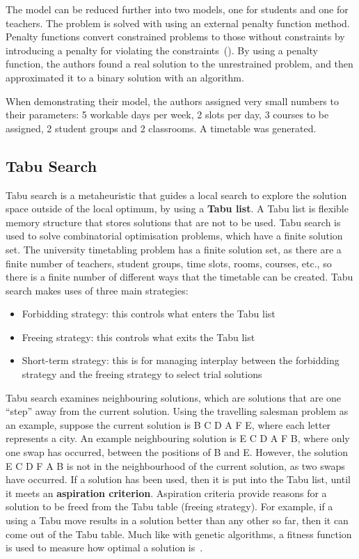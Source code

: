 \documentclass[a4paper, 12pt]{report}
\begin{document}
The model can be reduced further into two models, one for students and one for
teachers.
The problem is solved with using an external penalty function method. Penalty
functions convert constrained problems to those without constraints by
introducing a penalty for violating the constraints~(\cite{penalty_function}).
By using a penalty function, the authors found a real solution
to the unrestrained problem, and then approximated it to a binary solution with
an algorithm.

When demonstrating their model, the authors assigned very small numbers to their
parameters: 5 workable days per week, 2 slots per day, 3 courses to be assigned,
2 student groups and 2 classrooms. A timetable was generated.

\subsection{Tabu Search}

Tabu search is a metaheuristic that guides a local search to explore the
solution space outside of the local optimum, by using a \textbf{Tabu list}.
A Tabu list is flexible memory structure that stores solutions that are not to
be used.
Tabu search is used to solve combinatorial optimisation problems, which have a
finite solution set.
The university timetabling problem has a finite solution set, as there are a
finite number of teachers, student groups, time slots, rooms, courses, etc., so
there is a finite number of different ways that the timetable can be created.
Tabu search makes uses of three main strategies:
\begin{itemize}
	\item Forbidding strategy: this controls what enters the Tabu list
	\item Freeing strategy: this controls what exits the Tabu list
	\item Short-term strategy: this is for managing interplay between the
		forbidding strategy and the freeing strategy to select trial solutions
\end{itemize}
Tabu search examines neighbouring solutions, which are solutions that are one
“step” away from the current solution.
Using the travelling salesman problem as an example, suppose the current
solution is B C D A F E, where each letter represents a city.
An example neighbouring solution is E C D A F B, where only one swap has
occurred, between the positions of B and E.
However, the solution E C D F A B is not in the neighbourhood of the current
solution, as two swaps have occurred.
If a solution has been used, then it is put into the Tabu list, until it meets
an \textbf{aspiration criterion}.
Aspiration criteria provide reasons for a solution to be freed from the Tabu
table (freeing strategy).
For example, if a using a Tabu move results in a solution better than any other
so far, then it can come out of the Tabu table. Much like with genetic
algorithms, a fitness function is used to measure how optimal a solution 
is~\cite{tabu_video}.
\end{document}
